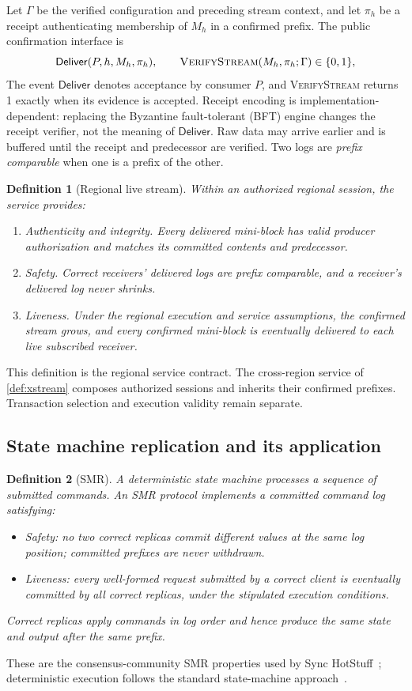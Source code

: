 \documentclass[11pt,a4paper,onecolumn]{article}
\newcommand{\Tag}[1]{\ensuremath{\mathsf{#1}}}
\newcommand{\Proc}[1]{\textnormal{\textsc{#1}}}
\newtheorem{definition}{Definition}[section]
\newcounter{protocol}
\begin{document}
Let $\Gamma$ be the verified configuration and preceding stream context,
and let $\pi_h$ be a receipt authenticating membership of $M_h$ in a
confirmed prefix. The public confirmation interface is
\[
 \Tag{Deliver}(P,h,M_h,\pi_h),\qquad
 \Proc{VerifyStream}(M_h,\pi_h;\Gamma)\in\{0,1\},
\]
The event \Tag{Deliver} denotes acceptance by consumer $P$, and
\Proc{VerifyStream} returns 1 exactly when its evidence is accepted.
Receipt encoding is implementation-dependent: replacing the Byzantine
fault-tolerant (BFT) engine changes
the receipt verifier, not the meaning of \Tag{Deliver}. Raw data may arrive
earlier and is buffered until the receipt and predecessor are verified.
Two logs are \emph{prefix comparable} when one is a prefix of the other.

\begin{definition}[Regional live stream]\label{def:stream}
Within an authorized regional session, the service provides:
\begin{enumerate}[label=(\roman*)]
\item \emph{Authenticity and integrity.} Every delivered mini-block has valid
producer authorization and matches its committed contents and predecessor.
\item \emph{Safety.} Correct receivers' delivered logs are prefix comparable,
and a receiver's delivered log never shrinks.
\item \emph{Liveness.} Under the regional execution and service assumptions,
the confirmed stream grows, and every confirmed mini-block is eventually
delivered to each live subscribed receiver.
\end{enumerate}
\end{definition}
This definition is the regional service contract. The cross-region service
of \cref{def:xstream} composes authorized sessions and inherits their confirmed
prefixes. Transaction selection and execution validity remain separate.

\subsection{State machine replication and its application}\label{sec:smr}
\begin{definition}[SMR]\label{def:smr}
A deterministic state machine processes a sequence of submitted commands.
An SMR protocol implements a committed command log satisfying:
\begin{itemize}
\item \emph{Safety:} no two correct replicas commit different values at the
same log position; committed prefixes are never withdrawn.
\item \emph{Liveness:} every well-formed request submitted by a correct client
is eventually committed by all correct replicas, under the stipulated
execution conditions.
\end{itemize}
Correct replicas apply commands in log order and hence produce the same state
and output after the same prefix.
\end{definition}
These are the consensus-community SMR properties used by Sync
HotStuff~\cite{synchotstuff}; deterministic execution follows the standard
state-machine approach~\cite{schneider}.
\end{document}
